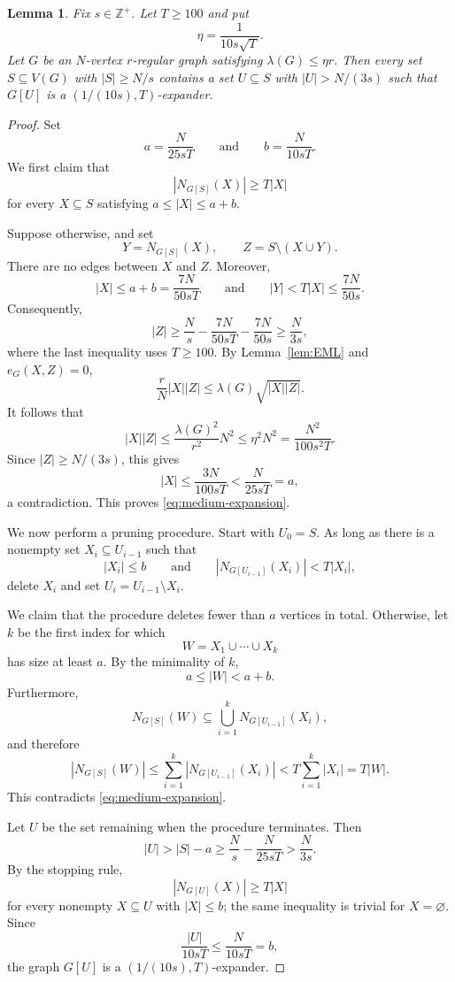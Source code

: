 \documentclass[10pt,a4paper]{amsart}
\newtheorem{lemma}{Lemma}
\begin{document}
\begin{lemma}\label{lem:robust}
Fix $s\in\mathbb{Z}^+$. Let $T\ge 100$ and put
\[
\eta=\frac{1}{10s\sqrt{T}}.
\]
Let $G$ be an
$N$-vertex $r$-regular graph satisfying
$\lambda(G)\le\eta r$. Then every set $S\subseteq V(G)$ with
$|S|\ge N/s$ contains a set $U\subseteq S$ with $|U|>N/(3s)$ such that
$G[U]$ is a $(1/(10s),T)$-expander.
\end{lemma}

\begin{proof}
Set
\[
a=\frac{N}{25sT}
\qquad\text{and}\qquad
b=\frac{N}{10sT}.
\]
We first claim that
\begin{equation}\label{eq:medium-expansion}
|N_{G[S]}(X)|\ge T|X|
\end{equation}
for every $X\subseteq S$ satisfying $a\le |X|\le a+b$.

Suppose otherwise, and set
\[
Y=N_{G[S]}(X),
\qquad
Z=S\setminus(X\cup Y).
\]
There are no edges between $X$ and $Z$. Moreover,
\[
|X|\le a+b=\frac{7N}{50sT}
\qquad\text{and}\qquad
|Y|<T|X|\le\frac{7N}{50s}.
\]
Consequently,
\[
|Z|\ge \frac{N}{s}-\frac{7N}{50sT}-\frac{7N}{50s}
     \ge \frac{N}{3s},
\]
where the last inequality uses $T\ge100$. By
Lemma~\ref{lem:EML} and $e_G(X,Z)=0$,
\[
\frac{r}{N}|X||Z|
 \le \lambda(G)\sqrt{|X||Z|}.
\]
It follows that
\[
|X||Z|
 \le \frac{\lambda(G)^2}{r^2}N^2
 \le \eta^2N^2
 =\frac{N^2}{100s^2T}.
\]
Since $|Z|\ge N/(3s)$, this gives
\[
|X|\le\frac{3N}{100sT}<\frac{N}{25sT}=a,
\]
a contradiction. This proves \eqref{eq:medium-expansion}.

We now perform a pruning procedure. Start with $U_0=S$. As long as there
is a nonempty set $X_i\subseteq U_{i-1}$ such that
\[
|X_i|\le b
\qquad\text{and}\qquad
|N_{G[U_{i-1}]}(X_i)|<T|X_i|,
\]
delete $X_i$ and set $U_i=U_{i-1}\setminus X_i$.

We claim that the procedure deletes fewer than $a$ vertices in total.
Otherwise, let $k$ be the first index for which
\[
W=X_1\cup\cdots\cup X_k
\]
has size at least $a$. By the minimality of $k$,
\[
a\le |W|<a+b.
\]
Furthermore,
\[
N_{G[S]}(W)
 \subseteq \bigcup_{i=1}^k N_{G[U_{i-1}]}(X_i),
\]
and therefore
\[
|N_{G[S]}(W)|
 \le \sum_{i=1}^k |N_{G[U_{i-1}]}(X_i)|
 < T\sum_{i=1}^k|X_i|
 =T|W|.
\]
This contradicts \eqref{eq:medium-expansion}.

Let $U$ be the set remaining when the procedure terminates. Then
\[
|U|>|S|-a
 \ge\frac{N}{s}-\frac{N}{25sT}
 >\frac{N}{3s}.
\]
By the stopping rule,
\[
|N_{G[U]}(X)|\ge T|X|
\]
for every nonempty $X\subseteq U$ with $|X|\le b$; the same inequality is
trivial for $X=\varnothing$. Since
\[
\frac{|U|}{10sT}\le\frac{N}{10sT}=b,
\]
the graph $G[U]$ is a $(1/(10s),T)$-expander.
\end{proof}
\end{document}
